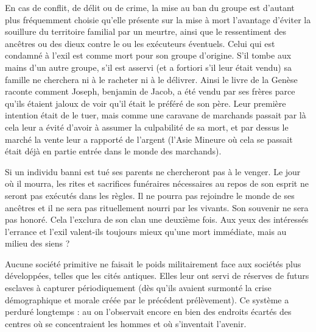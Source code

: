 En cas de conflit, de délit ou de crime, la mise au ban du groupe 
est d'autant plus fréquemment choisie qu'elle présente sur la mise à mort 
l'avantage d'éviter la souillure du territoire familial par un meurtre, ainsi 
que le ressentiment des ancêtres ou des dieux contre le ou les exécuteurs 
éventuels. Celui qui est condamné à l'exil est comme mort pour son 
groupe d'origine. S'il tombe aux mains d'un autre groupe, s'il est asservi 
(et a fortiori s'il leur était vendu) sa famille ne cherchera ni à le racheter 
ni à le délivrer. Ainsi le livre de la Genèse raconte comment Joseph,
benjamin de Jacob, a été vendu par ses frères parce qu'ils étaient jaloux de 
voir qu'il était le préféré de son père. Leur première intention était de le 
tuer, mais comme une caravane de marchands passait par là cela leur a 
évité d'avoir à assumer la culpabilité de sa mort, et par dessus le marché 
la vente leur a rapporté de l'argent (l'Asie Mineure où cela se passait était 
déjà en partie entrée dans le monde des marchands).

Si un individu banni est tué ses parents ne chercheront pas à le 
venger. Le jour où il mourra, les rites et sacrifices funéraires nécessaires 
au repos de son esprit ne seront pas exécutés dans les règles. Il ne pourra 
pas rejoindre le monde de ses ancêtres et il ne sera pas rituellement
nourri par les vivants. Son souvenir ne sera pas honoré. Cela l'exclura de son 
clan une deuxième fois. Aux yeux des intéressés l'errance et l'exil
valent-ils toujours mieux qu'une mort immédiate, mais au milieu des siens ?

Aucune société primitive ne faisait le poids militairement face 
aux sociétés plus développées, telles que les cités antiques. Elles leur 
ont servi de réserves de futurs esclaves à capturer périodiquement (dès 
qu'ils avaient surmonté la crise démographique et morale créée par le précédent prélèvement). Ce 
système a perduré longtemps : au  on l'observait encore
en bien des endroits écartés des centres où se concentraient les hommes 
et où s'inventait l'avenir.



